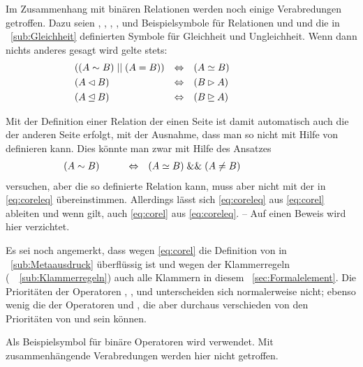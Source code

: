 Im Zusammenhang mit binären Relationen werden noch einige Verabredungen getroffen.
Dazu seien , , , ,  und  Beispielsymbole für Relationen und  und  die in \sectionname~\vref{sub:Gleichheit} definierten Symbole für Gleichheit und Ungleichheit.
Wenn dann nichts anderes gesagt wird gelte stets:
\begin{align}
	& ((A \sim   B) \;||\; (A = B)) & \Leftrightarrow &&& (A \simeq  B)
	\label{eq:coreleq}   \\
	& (A \lhd   B)                  & \Leftrightarrow &&& (B \rhd   A)
	\label{eq:colrrel}   \\
	& (A \unlhd B)                  & \Leftrightarrow &&& (B \unrhd A)
	\label{eq:colrreleq} &&&&&&&&&&
\end{align}

Mit der Definition einer Relation der einen Seite ist damit automatisch auch die der anderen Seite erfolgt, mit der Ausnahme, dass man  so nicht mit Hilfe von  definieren kann.
Dies könnte man zwar mit Hilfe des Ansatzes
\begin{align}
	& (A \sim B) &&&&& \Leftrightarrow &&&
	(A \simeq B) \;\&\&\; (A \ne B) \label{eq:corel} &&&&&&&&&&
\end{align}
versuchen, aber die so definierte Relation \symqt{$\relbsp$} kann, muss aber nicht mit der in \eqref{eq:coreleq} übereinstimmen.
Allerdings lässt sich \eqref{eq:coreleq} aus \eqref{eq:corel} ableiten und wenn  gilt, auch \eqref{eq:corel} aus \eqref{eq:coreleq}.
-- Auf einen Beweis wird hier verzichtet.

Es sei noch angemerkt, dass wegen \eqref{eq:corel} die Definition von \symqt{$\metarep$} in \sectionname~\vref{sub:Metaausdruck} überflüssig ist und wegen der Klammerregeln (\seename\ \subsectionname~\vref{sub:Klammerregeln}) auch alle Klammern in diesem \sectionname~\ref{sec:Formalelement}.
Die Prioritäten der Operatoren \symqt{$\lrelbsp$}, \symqt{$\rrelbsp$}, \symqt{$\lreleqbsp$} und \symqt{$\rreleqbsp$} unterscheiden sich normalerweise nicht; ebenso wenig die der Operatoren \symqt{$\relbsp$} und \symqt{$\releqbsp$}, die aber durchaus verschieden von den Prioritäten von \symqt{$=$} und \symqt{$\ne$} sein können.

Als Beispielsymbol für binäre Operatoren wird \symqt{$\opbsp$} verwendet.
Mit \symqt{$\opbsp$} zusammenhängende Verabredungen werden hier nicht getroffen.


